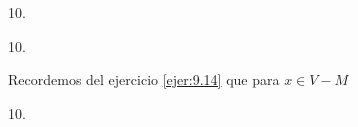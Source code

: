 \documentclass[twoside]{article}
\begin{document}
\begin{ejercicio}{10.}

\end{ejercicio}
\begin{solucion}

 
\end{solucion}
\newpage

\begin{ejercicio}{10.}

\end{ejercicio}
\begin{solucion}
Recordemos del ejercicio \ref{ejer:9.14} que para $x\in V-M$

\end{solucion}
\newpage

\begin{ejercicio}{10.}

\end{ejercicio}
\begin{solucion}

\end{solucion}
\end{document}
